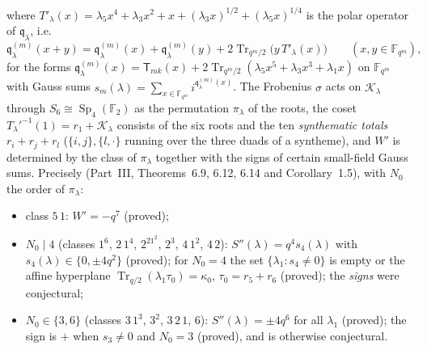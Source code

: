 \documentclass[12pt,a4paper]{amsart}
\theoremstyle{definition}
\newcommand{\F}{\mathbb{F}}
\newcommand{\Tr}{\operatorname{Tr}}
\newcommand{\Sp}{\operatorname{Sp}}
\newcommand{\Kk}{\mathcal{K}}
\newcommand{\qq}{\mathfrak{q}}
\newcommand{\Spp}{S''}
\newcommand{\Tw}{\mathsf{T}}
\begin{document}
where $T'_\lambda(x)=\lambda_5x^4+\lambda_3x^2+x+(\lambda_3x)^{1/2}+(\lambda_5x)^{1/4}$ is the polar operator of $\qq_\lambda$, i.e.
\begin{equation}\label{eq:polar}
\qq^{(m)}_\lambda(x+y)=\qq^{(m)}_\lambda(x)+\qq^{(m)}_\lambda(y)+2\Tr_{q^m/2}\bigl(y\,T'_\lambda(x)\bigr)\qquad(x,y\in\F_{q^m}),
\end{equation}
for the forms $\qq^{(m)}_\lambda(x)=\Tw_{mk}(x)+2\Tr_{q^m/2}(\lambda_5x^5+\lambda_3x^3+\lambda_1x)$ on $\F_{q^m}$ with Gauss sums $s_m(\lambda)=\sum_{x\in\F_{q^m}}i^{\qq^{(m)}_\lambda(x)}$. The Frobenius $\sigma$ acts on $\Kk_\lambda$ through $S_6\cong\Sp_4(\F_2)$ \cite{Atlas} as the permutation $\pi_\lambda$ of the roots, the coset $T_\lambda'^{-1}(1)=r_1+\Kk_\lambda$ consists of the six roots and the ten \emph{synthematic totals} $r_i+r_j+r_l$ ($\{i,j\},\{l,\cdot\}$ running over the three duads of a syntheme), and $W'$ is determined by the class of $\pi_\lambda$ together with the signs of certain small-field Gauss sums. Precisely (Part~III, Theorems~6.9, 6.12, 6.14 and Corollary~1.5), with $N_0$ the order of $\pi_\lambda$:
\begin{itemize}[leftmargin=2em]
\item class $5\,1$: $W'=-q^7$ (proved);
\item $N_0\mid4$ (classes $1^6$, $2\,1^4$, $2^21^2$, $2^3$, $4\,1^2$, $4\,2$): $\Spp(\lambda)=q^4s_4(\lambda)$ with $s_4(\lambda)\in\{0,\pm4q^2\}$ (proved); for $N_0=4$ the set $\{\lambda_1:s_4\ne0\}$ is empty or the affine hyperplane $\Tr_{q/2}(\lambda_1\tau_0)=\kappa_0$, $\tau_0=r_5+r_6$ (proved); the \emph{signs} were conjectural;
\item $N_0\in\{3,6\}$ (classes $3\,1^3$, $3^2$, $3\,2\,1$, $6$): $\Spp(\lambda)=\pm4q^6$ for all $\lambda_1$ (proved); the sign is $+$ when $s_3\ne0$ and $N_0=3$ (proved), and is otherwise conjectural.
\end{itemize}
\end{document}
